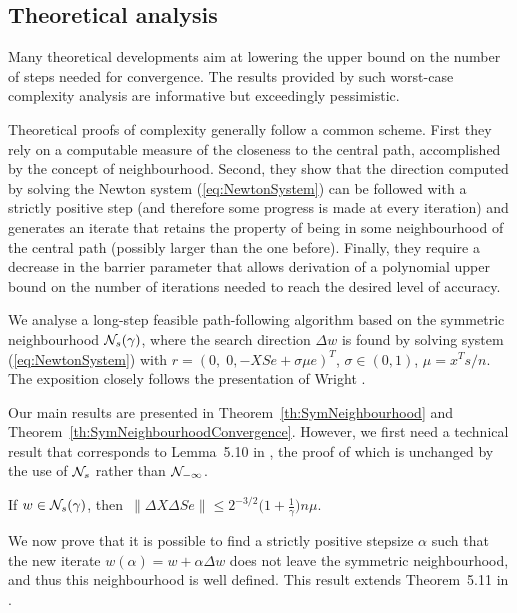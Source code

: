 %
%
\subsection{Theoretical analysis}

Many theoretical developments aim at lowering the upper bound on the number 
of steps needed for convergence. The results provided by such worst-case 
complexity analysis are informative but exceedingly pessimistic. 

Theoretical proofs of complexity generally follow a common scheme.
First they rely on a computable measure of the closeness to the central
path, accomplished by the concept of neighbourhood. Second,
they show that the direction computed by solving the Newton system
(\ref{eq:NewtonSystem}) can be followed with a strictly positive step
(and therefore some progress is made at every iteration) 
and generates an iterate 
that retains the property of being in some neighbourhood of the central 
path (possibly larger than the one before). Finally, they require
a decrease in the barrier parameter that allows derivation 
of a polynomial upper
bound on the number of iterations needed to reach the desired
level of accuracy.

We analyse a long-step feasible path-following 
algorithm based on the symmetric neighbourhood $\mathcal{N}_s(\gamma)$, 
where the search direction $\Delta w$ 
is found by solving system (\ref{eq:NewtonSystem}) with 
$r=(0,\; 0,-XSe+\sigma\mu e)^T$, $\sigma\in(0,1)$, $\mu=x^Ts/n$.
The exposition closely follows the presentation of Wright
\cite[Chapter~5]{ipm:Wright97}. 

Our main results are presented in Theorem~\ref{th:SymNeighbourhood}
and Theorem~\ref{th:SymNeighbourhoodConvergence}.
However, we first need a technical result that corresponds to
Lemma~5.10 in \cite{ipm:Wright97}, the proof of which is unchanged by the use 
of $\mathcal{N}_s$ rather than $\mathcal{N}_{-\infty}$.
%
\begin{lemma} \label{Wright:5.10}
If $w \in \mathcal{N}_s(\gamma)$, then\,
\(
  \|\Delta X\Delta Se\| \le 2^{-3/2}
                        \Big( 1+ \displaystyle{\frac{1}{\gamma}} \Big)n\mu.
\)
\end{lemma}

We now prove that it is possible to find a strictly positive stepsize 
$\alpha$ such that the new iterate 
$w(\alpha) = w + \alpha\Delta w$
does not leave the symmetric neighbourhood, and thus this 
neighbourhood is well defined. This result extends 
Theorem~5.11 in \cite{ipm:Wright97}.

